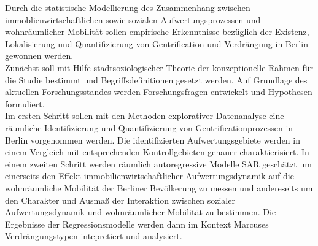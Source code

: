 \begin{itemize}
Durch die statistische Modellierung des Zusammenhang zwischen immoblienwirtschaftlichen sowie sozialen Aufwertungsprozessen und wohnräumlicher Mobilität sollen empirische Erkenntnisse bezüglich der Existenz, Lokalisierung und Quantifizierung von Gentrification und Verdrängung in Berlin gewonnen werden. \\
Zunächst soll mit Hilfe stadtsoziologischer Theorie der konzeptionelle Rahmen für die Studie bestimmt und Begriffsdefinitionen gesetzt werden. Auf Grundlage des aktuellen Forschungsstandes werden Forschungsfragen entwickelt und Hypothesen formuliert. \\
Im ersten Schritt sollen mit den Methoden explorativer Datenanalyse eine räumliche Identifizierung und Quantifizierung von Gentrificationprozessen in Berlin vorgenommen werden. Die identifizierten Aufwertungsgebiete werden in einem Vergleich mit entsprechenden Kontrollgebieten genauer charaktierisiert. In einem zweiten Schritt werden räumlich autoregressive Modelle SAR geschätzt um einerseits den Effekt immobilienwirtschaftlicher Aufwertungsdynamik auf die wohnräumliche Mobilität der Berliner Bevölkerung zu messen und andereseits um den Charakter und Ausmaß der Interaktion zwischen sozialer Aufwertungsdynamik und wohnräumlicher Mobilität zu bestimmen. Die Ergebnisse der Regressionsmodelle werden dann im Kontext Marcuses Verdrängungstypen intepretiert und analysiert.
\end{itemize}
